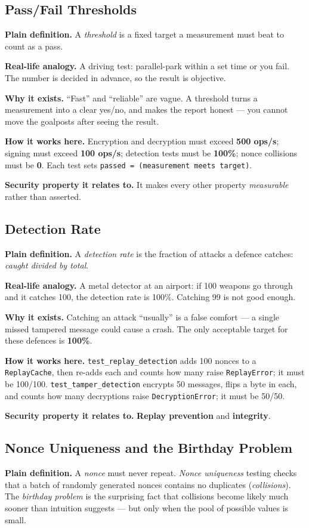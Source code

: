 \documentclass[11pt,a4paper]{article}
\begin{document}
\subsection{Pass/Fail Thresholds}
\textbf{Plain definition.} A \emph{threshold} is a fixed target a measurement
must beat to count as a pass.

\textbf{Real-life analogy.} A driving test: parallel-park within a set time or you
fail. The number is decided in advance, so the result is objective.

\textbf{Why it exists.} ``Fast'' and ``reliable'' are vague. A threshold turns a
measurement into a clear yes/no, and makes the report honest --- you cannot move
the goalposts after seeing the result.

\textbf{How it works here.} Encryption and decryption must exceed
\textbf{500 ops/s}; signing must exceed \textbf{100 ops/s}; detection tests must
be \textbf{100\%}; nonce collisions must be \textbf{0}. Each test sets
\texttt{passed = (measurement\ meets\ target)}.

\textbf{Security property it relates to.} It makes every other property
\emph{measurable} rather than asserted.

\subsection{Detection Rate}
\textbf{Plain definition.} A \emph{detection rate} is the fraction of attacks a
defence catches: \emph{caught divided by total}.

\textbf{Real-life analogy.} A metal detector at an airport: if 100 weapons go
through and it catches 100, the detection rate is 100\%. Catching 99 is not good
enough.

\textbf{Why it exists.} Catching an attack ``usually'' is a false comfort --- a
single missed tampered message could cause a crash. The only acceptable target
for these defences is \textbf{100\%}.

\textbf{How it works here.} \texttt{test\_replay\_detection} adds 100 nonces to a
\texttt{ReplayCache}, then re-adds each and counts how many raise
\texttt{ReplayError}; it must be 100/100. \texttt{test\_tamper\_detection}
encrypts 50 messages, flips a byte in each, and counts how many decryptions
raise \texttt{DecryptionError}; it must be 50/50.

\textbf{Security property it relates to.} \textbf{Replay prevention} and
\textbf{integrity}.

\subsection{Nonce Uniqueness and the Birthday Problem}
\textbf{Plain definition.} A \emph{nonce} must never repeat. \emph{Nonce
uniqueness} testing checks that a batch of randomly generated nonces contains no
duplicates (\emph{collisions}). The \emph{birthday problem} is the surprising
fact that collisions become likely much sooner than intuition suggests --- but
only when the pool of possible values is small.
\end{document}
